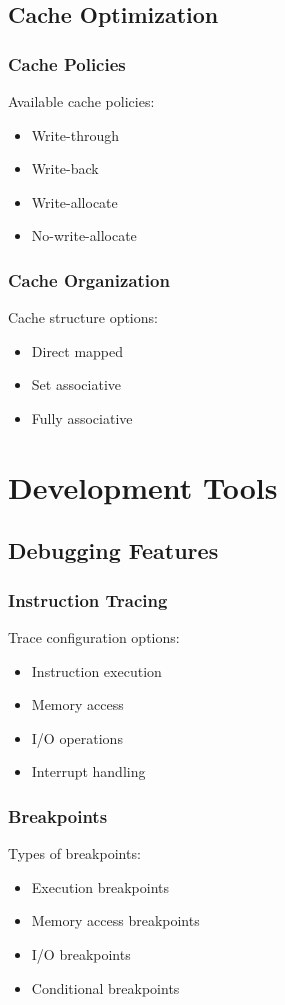 \documentclass[a4paper,11pt]{book}
\begin{document}
\section{Cache Optimization}
\subsection{Cache Policies}
Available cache policies:
\begin{itemize}
    \item Write-through
    \item Write-back
    \item Write-allocate
    \item No-write-allocate
\end{itemize}

\subsection{Cache Organization}
Cache structure options:
\begin{itemize}
    \item Direct mapped
    \item Set associative
    \item Fully associative
\end{itemize}

\chapter{Development Tools}
\section{Debugging Features}
\subsection{Instruction Tracing}
Trace configuration options:
\begin{itemize}
    \item Instruction execution
    \item Memory access
    \item I/O operations
    \item Interrupt handling
\end{itemize}

\subsection{Breakpoints}
Types of breakpoints:
\begin{itemize}
    \item Execution breakpoints
    \item Memory access breakpoints
    \item I/O breakpoints
    \item Conditional breakpoints
\end{itemize}
\end{document}

